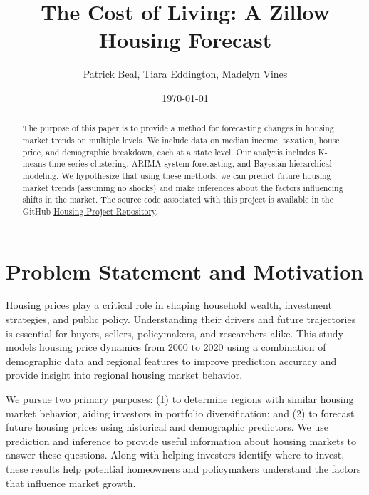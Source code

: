 \documentclass[11pt]{amsart}
\title{The Cost of Living: A Zillow Housing Forecast}
\author{Patrick Beal, Tiara Eddington, Madelyn Vines}
\date{\today} %
\begin{document}
\maketitle %

\begin{abstract}
The purpose of this paper is to provide a method for forecasting changes in housing market trends on multiple levels.
We include data on median income, taxation, house price, and demographic breakdown, each at a state level.
Our analysis includes K-means time-series clustering, ARIMA system forecasting, and Bayesian hierarchical modeling.
We hypothesize that using these methods, we can predict future housing market trends (assuming no shocks) and make inferences about the factors influencing shifts in the market. The source code associated with this project is available in the GitHub \href{https://github.com/jpatrickb/vol3_housing_project}{Housing Project Repository}.


\end{abstract}

\section{Problem Statement and Motivation}
Housing prices play a critical role in shaping household wealth, investment strategies, and public policy.
Understanding their drivers and future trajectories is essential for buyers, sellers, policymakers, and researchers alike. 
This study models housing price dynamics from 2000 to 2020 using a combination of demographic data and regional features to improve prediction accuracy and provide insight into regional housing market behavior.

We pursue two primary purposes: (1) to determine regions with similar housing market behavior, aiding investors in portfolio diversification; and (2) to forecast future housing prices using historical and demographic predictors.
We use prediction and inference to provide useful information about housing markets to answer these questions.
Along with helping investors identify where to invest, these results help potential homeowners and policymakers understand the factors that influence market growth.
\end{document}
